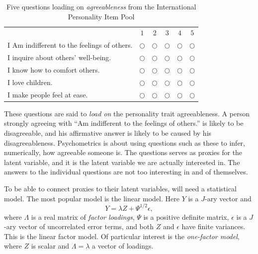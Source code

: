 \begin{table}
\caption{\label{tab:IPIP}Five questions loading on \textit{agreeableness} from the International Personality Item Pool}
\noindent \begin{centering}
\begin{tabular}{lccccc}
 & $1$ & $2$ & $3$ & $4$ & $5$\tabularnewline
I Am indifferent to the feelings of others.  & $\bigcirc$ & $\bigcirc$ & $\bigcirc$ & $\bigcirc$ & $\bigcirc$\tabularnewline
I inquire about others' well-being. & $\bigcirc$ & $\bigcirc$ & $\bigcirc$ & $\bigcirc$ & $\bigcirc$\tabularnewline
I know how to comfort others. & $\bigcirc$ & $\bigcirc$ & $\bigcirc$ & $\bigcirc$ & $\bigcirc$\tabularnewline
I love children. & $\bigcirc$ & $\bigcirc$ & $\bigcirc$ & $\bigcirc$ & $\bigcirc$\tabularnewline
I make people feel at ease.  & $\bigcirc$ & $\bigcirc$ & $\bigcirc$ & $\bigcirc$ & $\bigcirc$\tabularnewline
\end{tabular}
\par\end{centering}
\vskip7.0pt
\noindent {}
\end{table}

These questions are said to \textit{load on} the personality trait agreeableness. A person strongly agreeing with ``Am indifferent to the feelings of others.'' is likely to be disagreeable, and his affirmative answer is likely to be caused by his disagreeableness. Psychometrics is about using questions such as these to infer, numerically, how agreeable someone is. The questions serves as proxies for the latent variable, and it is the latent variable we are actually interested in. The answers to the individual questions are not too interesting in and of themselves.

To be able to connect proxies to their latent variables, will need a statistical model. The most popular model is the linear model. Here $Y$ is a $J$-ary vector and
\begin{equation}
Y=\lambda Z+\Psi^{1/2}\epsilon,\label{eq:one-factor model}
\end{equation}
where $\Lambda$ is a real matrix of \emph{factor loadings}, $\Psi$ is a positive definite matrix, $\epsilon$ is a $J$-ary vector of uncorrelated error terms, and both $Z$ and $\epsilon$ have finite variances. This is the linear factor model. Of particular interest is the \textit{one-factor model}, where $Z$ is scalar and $\Lambda = \lambda$ a vector of loadings.

